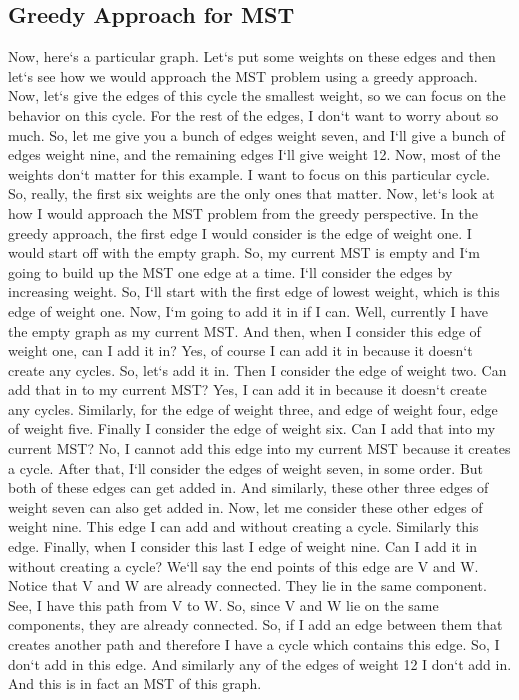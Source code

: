 \subsection{Greedy Approach for MST}
Now, here`s a particular graph.
Let`s put some weights on these edges and then let`s see how we would approach the MST problem using a greedy approach.
Now, let`s give the edges of this cycle the smallest weight, so we can focus on the behavior on this cycle.
For the rest of the edges, I don`t want to worry about so much.
So, let me give you a bunch of edges weight seven, and I`ll give a bunch of edges weight nine, and the remaining edges I`ll give weight 12.
Now, most of the weights don`t matter for this example.
I want to focus on this particular cycle.
So, really, the first six weights are the only ones that matter.
Now, let`s look at how I would approach the MST problem from the greedy perspective.
In the greedy approach, the first edge I would consider is the edge of weight one.
I would start off with the empty graph.
So, my current MST is empty and I`m going to build up the MST one edge at a time.
I`ll consider the edges by increasing weight.
So, I`ll start with the first edge of lowest weight, which is this edge of weight one.
Now, I`m going to add it in if I can.
Well, currently I have the empty graph as my current MST\@.
And then, when I consider this edge of weight one, can I add it in? Yes, of course I can add it in because it doesn`t create any cycles.
So, let`s add it in.
Then I consider the edge of weight two.
Can add that in to my current MST? Yes, I can add it in because it doesn`t create any cycles.
Similarly, for the edge of weight three, and edge of weight four, edge of weight five.
Finally I consider the edge of weight six.
Can I add that into my current MST? No, I cannot add this edge into my current MST because it creates a cycle.
After that, I`ll consider the edges of weight seven, in some order.
But both of these edges can get added in.
And similarly, these other three edges of weight seven can also get added in.
Now, let me consider these other edges of weight nine.
This edge I can add and without creating a cycle.
Similarly this edge.
Finally, when I consider this last I edge of weight nine.
Can I add it in without creating a cycle? We`ll say the end points of this edge are V and W\@.
Notice that V and W are already connected.
They lie in the same component.
See, I have this path from V to W\@.
So, since V and W lie on the same components, they are already connected.
So, if I add an edge between them that creates another path and therefore I have a cycle which contains this edge.
So, I don`t add in this edge.
And similarly any of the edges of weight 12 I don`t add in.
And this is in fact an MST of this graph.

